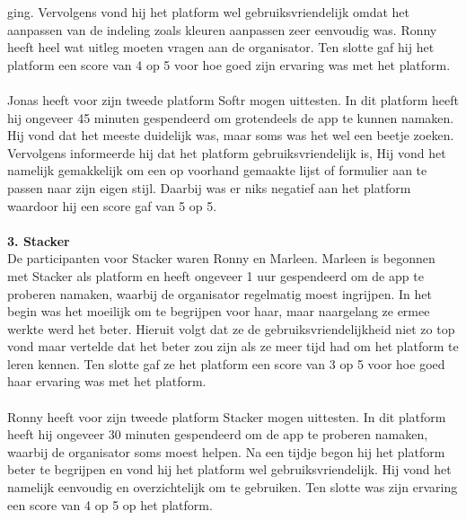 ging. Vervolgens vond hij het platform wel gebruiksvriendelijk omdat het aanpassen van de indeling zoals kleuren aanpassen zeer eenvoudig was. Ronny
heeft heel wat uitleg moeten vragen aan de organisator.
Ten slotte gaf hij het platform een score van 4 op 5 voor hoe goed zijn ervaring was met het platform.
\\
\\
Jonas heeft voor zijn tweede platform Softr mogen uittesten. In dit platform heeft hij ongeveer 45 minuten gespendeerd om grotendeels de app te kunnen namaken.
Hij vond dat het meeste duidelijk was, maar soms was het wel een beetje zoeken. Vervolgens informeerde hij dat het platform gebruiksvriendelijk is, Hij vond het namelijk gemakkelijk om
een op voorhand gemaakte lijst of formulier aan te passen naar zijn eigen stijl. Daarbij was er niks negatief aan het platform waardoor hij een score gaf van 5 op 5.
\\
\\
\textbf{3. Stacker}
\\
De participanten voor Stacker waren Ronny en Marleen. Marleen is begonnen met Stacker als platform en heeft ongeveer 1 uur  gespendeerd om de app te proberen namaken, waarbij de organisator regelmatig moest ingrijpen.
In het begin was het moeilijk om te begrijpen voor haar, maar naargelang ze ermee werkte werd het beter. Hieruit volgt dat ze de gebruiksvriendelijkheid niet zo top vond maar vertelde dat het beter zou zijn als ze meer tijd had om het platform te leren kennen.
Ten slotte gaf ze het platform een score van 3 op 5 voor hoe goed haar ervaring was met het platform.
\\
\\
Ronny heeft voor zijn tweede platform Stacker mogen uittesten. In dit platform heeft hij ongeveer 30 minuten gespendeerd om de app te proberen namaken, waarbij de organisator soms moest helpen.
Na een tijdje begon hij het platform beter te begrijpen en vond hij het platform wel gebruiksvriendelijk. Hij vond het namelijk eenvoudig en overzichtelijk om te gebruiken. Ten slotte was zijn ervaring een 
score van 4 op 5 op het platform.

